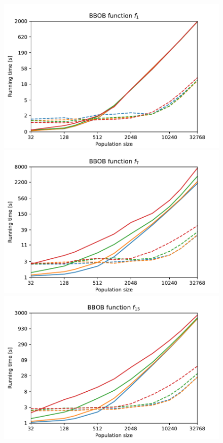 \begin{figure}[ht!]
    \begin{minipage}[t]{0.32\textwidth}
        \centering
        \includegraphics[width=\textwidth]{img/runs/time_pso2006_fn1_alldim.pdf}
    \end{minipage}
    \hfill
    \begin{minipage}[t]{0.32\textwidth}
        \centering
        \includegraphics[width=\textwidth]{img/runs/time_pso2006_fn7_alldim.pdf}
    \end{minipage}
    \hfill
    \begin{minipage}[t]{0.32\textwidth}
        \centering
        \includegraphics[width=\textwidth]{img/runs/time_pso2006_fn15_alldim.pdf}

\end{minipage}
\end{figure}
